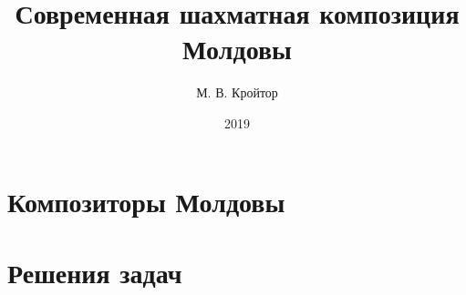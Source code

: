 \documentclass[14pt,b5paper]{book}
\title{Современная шахматная композиция Молдовы}
\author{М. В. Кройтор}
\date{2019}
\begin{document}


\chapter{Композиторы Молдовы}


\pagebreak


\pagebreak


\chapter{Решения задач}



\end{document}
